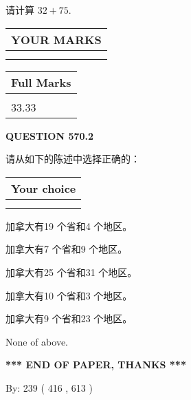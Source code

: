 \documentclass{ctexart}
\begin{document}
  
 
请计算 $ %
32 +  %
75 $.
 

 

 
  
\vspace{0.2in}
  
\noindent\begin{tabular}{|l|}
\hline
 YOUR MARKS  \\
\hline
 \\ 
 \\ 
\hline
\end{tabular}
\hspace{0.05in} \begin{tabular}{|l|}
\hline
 Full Marks  \\
\hline
 \\ 
33.33 \\
\hline
\end{tabular}
{\textbf{\Large{QUESTION
570.2 
}}}
  
  
请从如下的陈述中选择正确的：
  
  
\noindent\hspace{3.0in} \begin{tabular}{|l|}
\hline
Your choice \\
\hline
 \\ 
 \\ 
\hline
\end{tabular}
  
  
 
 
加拿大有19 个省和4 个地区。
 
 
加拿大有7 个省和9 个地区。
 
 
加拿大有25 个省和31 个地区。
 
 
加拿大有10 个省和3 个地区。
 
 
加拿大有9 个省和23 个地区。
 
 
 None of above.
 
 
   
   
 \vspace{0.2in}
 
   
   
   
   
\vspace{1.0in} 
{\textbf{\large{ *** END OF PAPER, THANKS *** }}} 
   
   
\hspace{1.0in} By: 
 239 ( 416 ,  613 )
   
\end{document}

